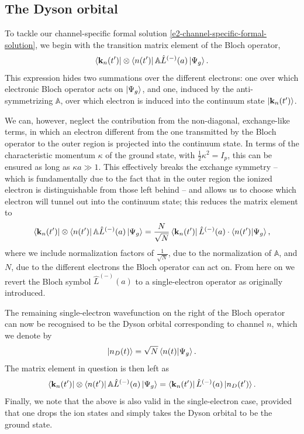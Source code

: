 \subsection{The Dyson orbital}
To tackle our channel-specific formal solution \eqref{e2-channel-specific-formal-solution}, we begin with the transition matrix element of the Bloch operator,
\begin{equation}
\bra{\vb{k}_n(t')}\otimes\bra{n(t')}\mathbb{A}\hat{L}^{(-)}(a)\ket{\Psi_g}.
\end{equation}
This expression hides two summations over the different electrons: one over which electronic Bloch operator acts on $\ket{\Psi_g}$, and one, induced by the anti-symmetrizing $\mathbb{A}$, over which electron is induced into the continuum state $\ket{\vb{k}_n(t')}$. 

We can, however, neglect the contribution from the non-diagonal, exchange-like terms, in which an electron different from the one transmitted by the Bloch operator to the outer region is projected into the continuum state. In terms of the characteristic momentum $\kappa$ of the ground state, with $\frac{1}{2}\kappa^2=I_p$, this can be ensured as long as $\kappa a\gg 1$. This effectively breaks the exchange symmetry -- which is fundamentally due to the fact that in the outer region the ionized electron is distinguishable from those left behind -- and allows us to choose which electron will tunnel out into the continuum state; this reduces the matrix element to 
\begin{equation}
\bra{\vb{k}_n(t')}\otimes\bra{n(t')}\mathbb{A}\hat{L}^{(-)}(a)\ket{\Psi_g}=\frac{N}{\sqrt{N}}\bra{\vb{k}_n(t')}\hat{L}^{(-)}(a)\cdot \braket{n(t')}{\Psi_g},
\end{equation}
where we include normalization factors of $\frac{1}{\sqrt{N}}$, due to the normalization of $\mathbb{A}$, and $N$, due to the different electrons the Bloch operator can act on. From here on we revert the Bloch symbol $\hat{L}^{(-)}(a)$ to a single-electron operator as originally introduced.

The remaining single-electron wavefunction on the right of the Bloch operator can now be recognised to be the Dyson orbital corresponding to channel $n$, which we denote by
\begin{equation}
\ket{n_{D}(t)}=\sqrt{N}\braket{n(t)}{\Psi_g}.
\label{e2-dysonorbital}
\end{equation}
The matrix element in question is then left as
\begin{equation}
\bra{\vb{k}_n(t')}\otimes\bra{n(t')}\mathbb{A}\hat{L}^{(-)}(a)\ket{\Psi_g}
=
\bra{\vb{k}_n(t')}\hat{L}^{(-)}(a)\ket{n_D(t')}.
\end{equation}
Finally, we note that the above is also valid in the single-electron case, provided that one drops the ion states and simply takes the Dyson orbital to be the ground state.




